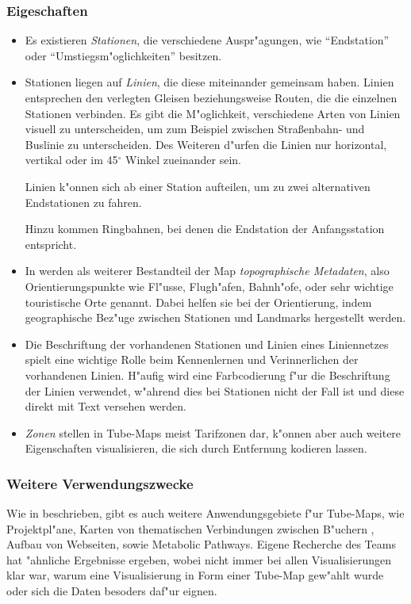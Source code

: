 \subsubsection{Eigeschaften}
\begin{itemize}
\item Es existieren \emph{Stationen}, die verschiedene Auspr"agungen, wie "`Endstation"' oder "`Umstiegsm"oglichkeiten"' besitzen. 

\item Stationen liegen auf \emph{Linien}, die diese miteinander gemeinsam haben. Linien entsprechen den verlegten Gleisen beziehungsweise Routen, die die einzelnen Stationen verbinden. Es gibt die M"oglichkeit, verschiedene Arten von Linien visuell zu unterscheiden, um zum Beispiel zwischen Stra\ss enbahn- und Buslinie zu unterscheiden. Des Weiteren d"urfen die Linien nur horizontal, vertikal oder im 45$^{\circ}$ Winkel zueinander sein. 

Linien k"onnen sich ab einer Station aufteilen, um zu zwei alternativen Endstationen zu fahren. 

Hinzu kommen Ringbahnen, bei denen die Endstation der Anfangsstation entspricht.

\item In \cite{automaticlayoutmetro08} werden als weiterer Bestandteil der Map \emph{topographische Metadaten}, also Orientierungspunkte wie Fl"usse, Flugh"afen, Bahnh"ofe, oder sehr wichtige touristische Orte genannt. Dabei helfen sie bei der Orientierung, indem geographische Bez"uge zwischen Stationen und Landmarks hergestellt werden.

\item Die Beschriftung der vorhandenen Stationen und Linien eines Liniennetzes spielt eine wichtige Rolle beim Kennenlernen und Verinnerlichen der vorhandenen Linien. H"aufig wird eine Farbcodierung f"ur die Beschriftung der Linien verwendet, w"ahrend dies bei Stationen nicht der Fall ist und diese direkt mit Text versehen werden. 

\item \emph{Zonen} stellen in Tube-Maps meist Tarifzonen dar, k"onnen aber auch weitere Eigenschaften visualisieren, die sich durch Entfernung kodieren lassen. 
\end{itemize}

\subsubsection{Weitere Verwendungszwecke}
\label{tm:verwendungszwecke}
Wie in \cite{automaticlayoutmetro08} beschrieben, gibt es auch weitere Anwendungsgebiete f"ur Tube-Maps, wie Projektpl"ane, Karten von thematischen Verbindungen zwischen B"uchern \cite{oreilly}, Aufbau von Webseiten, sowie Metabolic Pathways. Eigene Recherche des Teams hat "ahnliche Ergebnisse ergeben, wobei nicht immer bei allen Visualisierungen klar war, warum eine Visualisierung in Form einer Tube-Map gew"ahlt wurde oder sich die Daten besoders daf"ur eignen.

